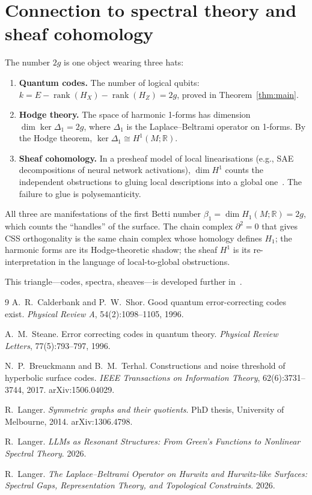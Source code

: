 \documentclass[11pt,a4paper]{article}
\begin{document}
\section{Connection to spectral theory and sheaf cohomology}
\label{sec:connection}

The number $2g$ is one object wearing three hats:

\begin{enumerate}[leftmargin=*]
\item \textbf{Quantum codes.} The number of logical qubits:
  $k = E - \operatorname{rank}(H_X) - \operatorname{rank}(H_Z) = 2g$,
  proved in Theorem~\ref{thm:main}.

\item \textbf{Hodge theory.} The space of harmonic 1-forms has
  dimension $\dim \ker \Delta_1 = 2g$, where $\Delta_1$ is the
  Laplace--Beltrami operator on 1-forms. By the Hodge theorem,
  $\ker \Delta_1 \cong H^1(M;\mathbb{R})$.

\item \textbf{Sheaf cohomology.} In a presheaf model of local
  linearisations (e.g., SAE decompositions of neural network activations),
  $\dim H^1$ counts the independent obstructions to gluing local
  descriptions into a global one~\cite{langer2026llm}. The failure to glue
  is polysemanticity.
\end{enumerate}

All three are manifestations of the first Betti number
$\beta_1 = \dim H_1(M; \mathbb{R}) = 2g$, which counts the ``handles'' of
the surface. The chain complex $\partial^2 = 0$ that gives CSS orthogonality
is the same chain complex whose homology defines $H_1$; the harmonic forms
are its Hodge-theoretic shadow; the sheaf $H^1$ is its re-interpretation
in the language of local-to-global obstructions.

This triangle---codes, spectra, sheaves---is developed further
in~\cite{langer2026llm,langer2026hurwitz}.


\begin{thebibliography}{9}
A.~R.~Calderbank and P.~W.~Shor.
Good quantum error-correcting codes exist.
\emph{Physical Review A}, 54(2):1098--1105, 1996.

A.~M.~Steane.
Error correcting codes in quantum theory.
\emph{Physical Review Letters}, 77(5):793--797, 1996.

N.~P.~Breuckmann and B.~M.~Terhal.
Constructions and noise threshold of hyperbolic surface codes.
\emph{IEEE Transactions on Information Theory}, 62(6):3731--3744, 2017.
arXiv:1506.04029.

R.~Langer.
\emph{Symmetric graphs and their quotients}.
PhD thesis, University of Melbourne, 2014. arXiv:1306.4798.

R.~Langer.
\emph{LLMs as Resonant Structures: From Green's Functions to Nonlinear
Spectral Theory}. 2026.

R.~Langer.
\emph{The Laplace--Beltrami Operator on Hurwitz and Hurwitz-like Surfaces:
Spectral Gaps, Representation Theory, and Topological Constraints}. 2026.
\end{thebibliography}
\end{document}
